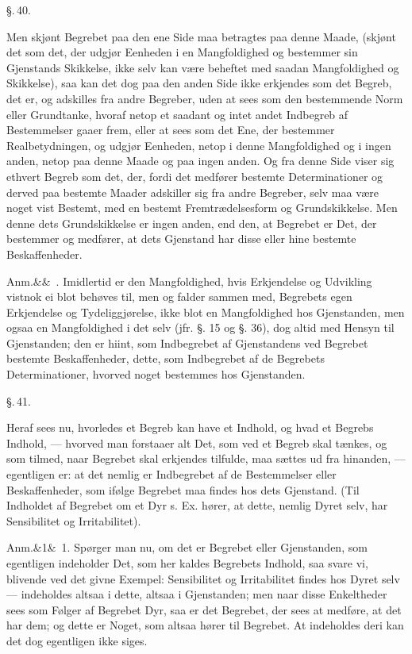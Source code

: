 \documentclass[12pt]{book}
\makeatletter
\def\sperr#1{#1}%
\def\textit#1{#1}%
\def\emph#1{#1}%
\newcommand{\sperr}[1]{\textls[180]{#1}}
\newcommand{\umph}[2][misc]{%
  \@ifundefined{umph@#1@on}{#2}{\emph{#2}}}
\newcommand{\parag}[1]{%
  \par\vspace{0.9\baselineskip}%
  {\centering\textit{\S.\,#1.}\par}%
  \vspace{0.35\baselineskip}%
  \noindent\hspace{\parindent}\ignorespaces
}
\newcommand{\anm}[1]{%
  \par\vspace{0.5\baselineskip}%
  \noindent\hspace{\parindent}\sperr{Anm.}\ifx&#1&\else~\textit{#1}.\fi
  \enspace\ignorespaces
}
\newcommand{\opage}[1]{\marginnote{\footnotesize\textit{[#1]}}}
\makeatother
\begin{document}
\parag{40}

Men skjønt Begrebet paa den ene Side maa betragtes paa denne Maade, (skjønt det
som det, der udgjør Eenheden i en Mangfoldighed og bestemmer sin Gjenstands
Skikkelse, ikke selv kan være beheftet med saadan Mangfoldighed og Skikkelse),
saa kan det dog paa den anden Side ikke erkjendes som det Begreb, det er, og
adskilles fra andre Begreber, uden at sees som den bestemmende Norm eller
Grundtanke, hvoraf netop et saadant og intet andet Indbegreb af Bestemmelser
gaaer frem, eller at sees som det Ene, der bestemmer Realbetydningen, og udgjør
Eenheden, netop i denne Mangfoldighed og i ingen anden, netop paa denne Maade og
paa ingen anden. Og fra denne Side viser sig ethvert Begreb som det, der, fordi
det medfører bestemte Determinationer og derved paa bestemte Maader adskiller sig
fra andre Begreber, selv maa være noget vist Bestemt, med en bestemt
Fremtrædelsesform og Grundskikkelse. Men denne dets Grundskikkelse er ingen
anden, end den, at Begrebet er Det, der bestemmer og medfører, at dets Gjenstand
har disse eller hine bestemte Beskaffenheder.

\opage{103} \anm{} Imidlertid er den Mangfoldighed, hvis Erkjendelse og Udvikling vistnok ei
blot behøves til, men og falder sammen med, Begrebets egen Erkjendelse og
Tydeliggjørelse, ikke blot en Mangfoldighed hos Gjenstanden, men ogsaa en
Mangfoldighed i det \umph[schwab]{Intellectuelle} selv (jfr. §. 15 og §. 36), dog altid med
\emph{Hensyn} til Gjenstanden; den er hiint, som Indbegrebet af Gjenstandens ved
Begrebet bestemte Beskaffenheder, dette, som Indbegrebet af de Begrebets
Determinationer, hvorved noget bestemmes hos Gjenstanden.

\parag{41}

Heraf sees nu, hvorledes et Begreb kan have et Indhold, og hvad et Begrebs
Indhold, --- hvorved man forstaaer alt Det, som ved et Begreb skal tænkes, og som
tilmed, naar Begrebet skal erkjendes tilfulde, maa sættes ud fra hinanden, ---
egentligen er: at det nemlig er Indbegrebet af de Bestemmelser eller
Beskaffenheder, som ifølge Begrebet maa findes hos dets Gjenstand. (Til Indholdet
af Begrebet om et Dyr s. Ex. hører, at dette, nemlig Dyret selv, har Sensibilitet
og Irritabilitet).

\anm{1} Spørger man nu, om det er Begrebet eller Gjenstanden, som egentligen
indeholder Det, som her kaldes Begrebets Indhold, saa svare vi, blivende ved det
givne Exempel: Sensibilitet og Irritabilitet findes hos Dyret selv ---
indeholdes altsaa i dette, altsaa i Gjenstanden; men naar disse Enkeltheder sees
som Følger af Begrebet Dyr, saa er det Begrebet, der sees at
\opage{104} medføre, at det har dem; og dette er Noget, som altsaa hører til Begrebet. At
indeholdes deri kan det dog egentligen ikke siges.
\end{document}
